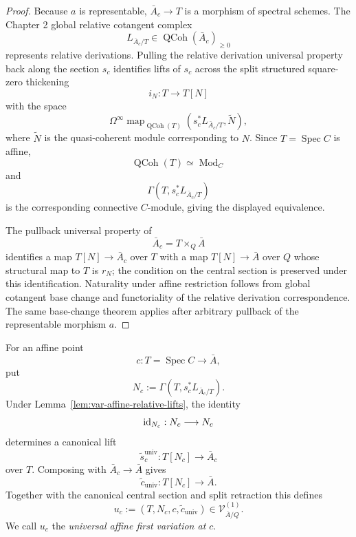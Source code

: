 \begin{proof}
Because \(a\) is representable, \(\bar A_c\to T\) is a morphism of spectral schemes. The Chapter 2 global relative cotangent complex
\[
    L_{\bar A_c/T}\in\operatorname{QCoh}(\bar A_c)_{\ge0}
\]
represents relative derivations. Pulling the relative derivation universal property back along the section \(s_c\) identifies lifts of \(s_c\) across the split structured square-zero thickening
\[
    i_N:T\longrightarrow T[N]
\]
with the space
\[
    \Omega^\infty
    \operatorname{map}_{\operatorname{QCoh}(T)}
    (s_c^*L_{\bar A_c/T},\widetilde N),
\]
where \(\widetilde N\) is the quasi-coherent module corresponding to \(N\). Since \(T=\operatorname{Spec}C\) is affine,
\[
    \operatorname{QCoh}(T)\simeq\operatorname{Mod}_C
\]
and
\[
    \Gamma(T,s_c^*L_{\bar A_c/T})
\]
is the corresponding connective \(C\)-module, giving the displayed equivalence.

The pullback universal property of
\[
    \bar A_c=T\times_Q\bar A
\]
identifies a map \(T[N]\to\bar A_c\) over \(T\) with a map \(T[N]\to\bar A\) over \(Q\) whose structural map to \(T\) is \(r_N\); the condition on the central section is preserved under this identification. Naturality under affine restriction follows from global cotangent base change and functoriality of the relative derivation correspondence. The same base-change theorem applies after arbitrary pullback of the representable morphism \(a\).
\end{proof}

\begin{construction}
\label{con:var-universal-first-variation}
For an affine point
\[
    c:T=\operatorname{Spec}C\longrightarrow\bar A,
\]
put
\[
    \boxed{
    N_c
    :=
    \Gamma(T,s_c^*L_{\bar A_c/T}).
    }
\]
Under Lemma~\ref{lem:var-affine-relative-lifts}, the identity
\[
    \operatorname{id}_{N_c}:N_c\longrightarrow N_c
\]
determines a canonical lift
\[
    \widetilde s_c^{\mathrm{univ}}:
    T[N_c]\longrightarrow\bar A_c
\]
over \(T\). Composing with \(\bar A_c\to\bar A\) gives
\[
    \widetilde c_{\mathrm{univ}}:
    T[N_c]\longrightarrow\bar A.
\]
Together with the canonical central section and split retraction this defines
\[
    \boxed{
    u_c:=(T,N_c,c,\widetilde c_{\mathrm{univ}})
    \in
    \mathcal V^{(1)}_{\bar A/Q}.
    }
\]
We call \(u_c\) the \emph{universal affine first variation at \(c\)}.
\end{construction}

